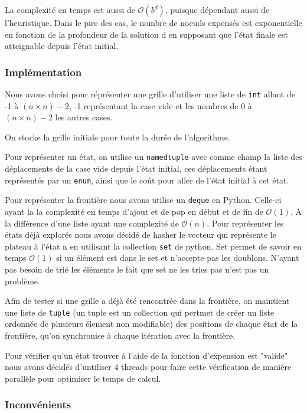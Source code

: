 \documentclass[a4paper, 12pt]{article}
\begin{document}
La complexité en temps est aussi de $\mathcal{O}(b^{d})$, puisque dépendant aussi de l'heuristique. Dans le pire des cas, le nombre de noeuds expensés est exponentielle en fonction de la profondeur de la solution d en supposant que l'état finale est atteignable depuis l'état initial.

\subsubsection{Implémentation}

Nous avons choisi pour réprésenter une grille d'utiliser une liste de \lstinline{int} allant de -1 à $(n \times n) - 2$, -1 représentant la case vide et les nombres de 0 à $(n \times n) - 2$ les autres cases.

On stocke la grille initiale pour toute la durée de l'algorithme.

Pour représenter un état, on utilise un \lstinline{namedtuple} avec comme champ la liste des déplacements de la case vide depuis l'état initial, ces déplacements étant représentés par un \lstinline{enum}, ainsi que le coût pour aller de l'état initial à cet état.

Pour représenter la frontière nous avons utilise un \lstinline{deque} en Python. Celle-ci ayant la la complexité en temps d'ajout et de pop en début et de fin de $\mathcal{O}(1)$. A la différence d'une liste ayant une complexité de $\mathcal{O}(n)$.
    Pour représenter les états déjà explorés nous avons décidé de hasher le vecteur qui représente le plateau à l'état n en utilisant la collection \lstinline{set} de python. Set permet de savoir en temps $\mathcal{O}(1)$ si un élément est dans le set et n'accepte pas les doublons. N'ayant pas besoin de trié les éléments le fait que set ne les tries pas n'est pas un problème.


Afin de tester si une grille a déjà été rencontrée dans la frontière, on maintient une liste de \lstinline{tuple} (un tuple est un collection qui pertmet de créer un liste ordonnée de plusieurs élement non modifiable) des positions de chaque état de la frontière, qu'on synchronise à chaque itération avec la frontière.


Pour vérifier qu'un état trouver à l'aide de la fonction d'expension est "valide" nous avons décidés d'untiliser 4 threads pour faire cette vérification de manière parallèle pour optimiser le temps de calcul.

\subsubsection{Inconvénients}
\end{document}
